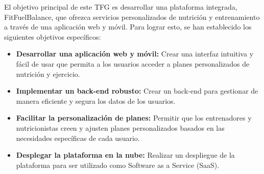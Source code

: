 El objetivo principal de este TFG es desarrollar una plataforma integrada, FitFuelBalance, que ofrezca servicios personalizados de nutrición y entrenamiento a través de una aplicación web y móvil. Para lograr esto, se han establecido los siguientes objetivos específicos:

\begin{itemize}
    \item \textbf{Desarrollar una aplicación web y móvil:} Crear una interfaz intuitiva y fácil de usar que permita a los usuarios acceder a planes personalizados de nutrición y ejercicio.
    \item \textbf{Implementar un back-end robusto:} Crear un back-end para gestionar de manera eficiente y segura los datos de los usuarios.
    \item \textbf{Facilitar la personalización de planes:} Permitir que los entrenadores y nutricionistas creen y ajusten planes personalizados basados en las necesidades específicas de cada usuario.
    \item \textbf{Desplegar la plataforma en la nube:} Realizar un despliegue de la plataforma para ser utilizado como Software as a Service (SaaS).
\end{itemize}
